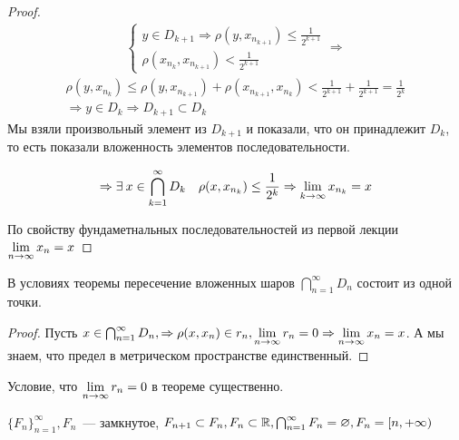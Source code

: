 \documentclass[document]{subfiles}
\begin{document}
\begin{proof}
    \begin{gather*}
        \begin{cases}
            y \in D_{k+1} \Rightarrow \rho(y, x_{n_{k+1}}) \leq \frac{1}{2^{k+1}} \\
            \rho(x_{n_k}, x_{n_{k+1}}) < \frac{1}{2^{k+1}}
        \end{cases} \Rightarrow 
    \end{gather*}
    \begin{multline*}
        \rho(y, x_{n_k}) \leq \rho(y, x_{n_{k+1}}) + \rho(x_{n_{k+1}}, x_{n_k}) < \frac{1}{2^{k+1}} + \frac{1}{2^{k+1}} = \frac{1}{2^k} \\
        \Rightarrow y \in D_k \Rightarrow D_{k+1} \subset D_k
    \end{multline*}
    Мы взяли произвольный элемент из $D_{k+1}$ и показали, что он принадлежит $D_k$, то есть показали вложенность элементов последовательности.

    \[ \Rightarrow \exists x \in \bigcap^\infty_{k=1} D_k \quad \rho(x, x_{n_k}) \leq \frac{1}{2^k} \Rightarrow \liml_{k \to \infty} x_{n_k} = x \]

    По свойству фундаметнальных последовательностей из первой лекции $\lim\limits_{n \to \infty} x_n = x$
\end{proof}

\begin{remark}
    В условиях теоремы пересечение вложенных шаров $\bigcap^\infty_{n=1} D_n$ состоит из одной точки.
\end{remark}

\begin{proof}
    Пусть $x \in \bigcap^\infty_{n=1} D_n, \Rightarrow \rho(x, x_n) \in r_n, \lim\limits_{n \to \infty} r_n = 0 \Rightarrow \lim\limits_{n \to \infty} x_n = x$.
    А мы знаем, что предел в метрическом пространстве единственный.
\end{proof}

\begin{remark}
    Условие, что $\lim\limits_{n \to \infty} r_n = 0$ в теореме существенно.
\end{remark}

\begin{example}
    $\{ F_n \}^\infty_{n=1}, F_n$~--- замкнутое, $F_{n+1} \subset F_n, F_n \subset \mathbb{R}, \bigcap^\infty_{n=1} F_n = \varnothing, F_n = [n, + \infty)$
\end{example}
\end{document}
